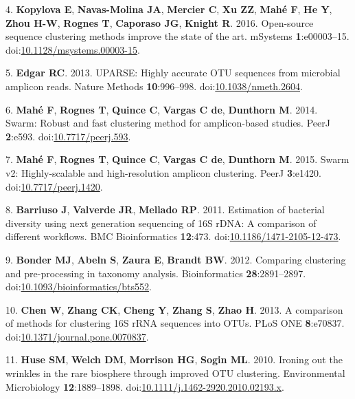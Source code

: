 \documentclass[11pt,]{article}
\begin{document}
\hypertarget{ref-Kopylova2016}{}
4. \textbf{Kopylova E}, \textbf{Navas-Molina JA}, \textbf{Mercier C},
\textbf{Xu ZZ}, \textbf{Mahé F}, \textbf{He Y}, \textbf{Zhou H-W},
\textbf{Rognes T}, \textbf{Caporaso JG}, \textbf{Knight R}. 2016.
Open-source sequence clustering methods improve the state of the art.
mSystems \textbf{1}:e00003--15.
doi:\href{https://doi.org/10.1128/msystems.00003-15}{10.1128/msystems.00003-15}.

\hypertarget{ref-Edgar2013}{}
5. \textbf{Edgar RC}. 2013. UPARSE: Highly accurate OTU sequences from
microbial amplicon reads. Nature Methods \textbf{10}:996--998.
doi:\href{https://doi.org/10.1038/nmeth.2604}{10.1038/nmeth.2604}.

\hypertarget{ref-Mah2014}{}
6. \textbf{Mahé F}, \textbf{Rognes T}, \textbf{Quince C}, \textbf{Vargas
C de}, \textbf{Dunthorn M}. 2014. Swarm: Robust and fast clustering
method for amplicon-based studies. PeerJ \textbf{2}:e593.
doi:\href{https://doi.org/10.7717/peerj.593}{10.7717/peerj.593}.

\hypertarget{ref-Mah2015}{}
7. \textbf{Mahé F}, \textbf{Rognes T}, \textbf{Quince C}, \textbf{Vargas
C de}, \textbf{Dunthorn M}. 2015. Swarm v2: Highly-scalable and
high-resolution amplicon clustering. PeerJ \textbf{3}:e1420.
doi:\href{https://doi.org/10.7717/peerj.1420}{10.7717/peerj.1420}.

\hypertarget{ref-Barriuso2011}{}
8. \textbf{Barriuso J}, \textbf{Valverde JR}, \textbf{Mellado RP}. 2011.
Estimation of bacterial diversity using next generation sequencing of
16S rDNA: A comparison of different workflows. BMC Bioinformatics
\textbf{12}:473.
doi:\href{https://doi.org/10.1186/1471-2105-12-473}{10.1186/1471-2105-12-473}.

\hypertarget{ref-Bonder2012}{}
9. \textbf{Bonder MJ}, \textbf{Abeln S}, \textbf{Zaura E},
\textbf{Brandt BW}. 2012. Comparing clustering and pre-processing in
taxonomy analysis. Bioinformatics \textbf{28}:2891--2897.
doi:\href{https://doi.org/10.1093/bioinformatics/bts552}{10.1093/bioinformatics/bts552}.

\hypertarget{ref-Chen2013}{}
10. \textbf{Chen W}, \textbf{Zhang CK}, \textbf{Cheng Y}, \textbf{Zhang
S}, \textbf{Zhao H}. 2013. A comparison of methods for clustering 16S
rRNA sequences into OTUs. PLoS ONE \textbf{8}:e70837.
doi:\href{https://doi.org/10.1371/journal.pone.0070837}{10.1371/journal.pone.0070837}.

\hypertarget{ref-Huse2010}{}
11. \textbf{Huse SM}, \textbf{Welch DM}, \textbf{Morrison HG},
\textbf{Sogin ML}. 2010. Ironing out the wrinkles in the rare biosphere
through improved OTU clustering. Environmental Microbiology
\textbf{12}:1889--1898.
doi:\href{https://doi.org/10.1111/j.1462-2920.2010.02193.x}{10.1111/j.1462-2920.2010.02193.x}.
\end{document}
